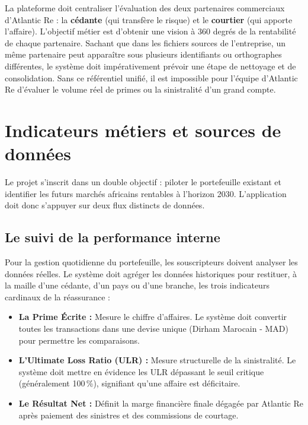 \documentclass[12pt,a4paper]{report}
\begin{document}
La plateforme doit centraliser l'évaluation des deux partenaires commerciaux d'Atlantic Re : la \textbf{cédante} (qui transfère le risque) et le \textbf{courtier} (qui apporte l'affaire). 
L'objectif métier est d'obtenir une vision à 360 degrés de la rentabilité de chaque partenaire. Sachant que dans les fichiers sources de l'entreprise, un même partenaire peut apparaître sous plusieurs identifiants ou orthographes différentes, le système doit impérativement prévoir une étape de nettoyage et de consolidation. Sans ce référentiel unifié, il est impossible pour l'équipe d'Atlantic Re d'évaluer le volume réel de primes ou la sinistralité d'un grand compte.

\section{Indicateurs métiers et sources de données}

Le projet s'inscrit dans un double objectif : piloter le portefeuille existant et identifier les futurs marchés africains rentables à l’horizon 2030. L'application doit donc s'appuyer sur deux flux distincts de données.

\subsection{Le suivi de la performance interne}

Pour la gestion quotidienne du portefeuille, les souscripteurs doivent analyser les données réelles. Le système doit agréger les données historiques pour restituer, à la maille d'une cédante, d'un pays ou d'une branche, les trois indicateurs cardinaux de la réassurance :
\begin{itemize}[leftmargin=1.5cm, itemsep=2pt]
  \item \textbf{La Prime Écrite :} Mesure le chiffre d'affaires. Le système doit convertir toutes les transactions dans une devise unique (Dirham Marocain - MAD) pour permettre les comparaisons.
  \item \textbf{L'Ultimate Loss Ratio (ULR) :} Mesure structurelle de la sinistralité. Le système doit mettre en évidence les ULR dépassant le seuil critique (généralement 100\,\%), signifiant qu'une affaire est déficitaire.
  \item \textbf{Le Résultat Net :} Définit la marge financière finale dégagée par Atlantic Re après paiement des sinistres et des commissions de courtage.
\end{itemize}
\end{document}

